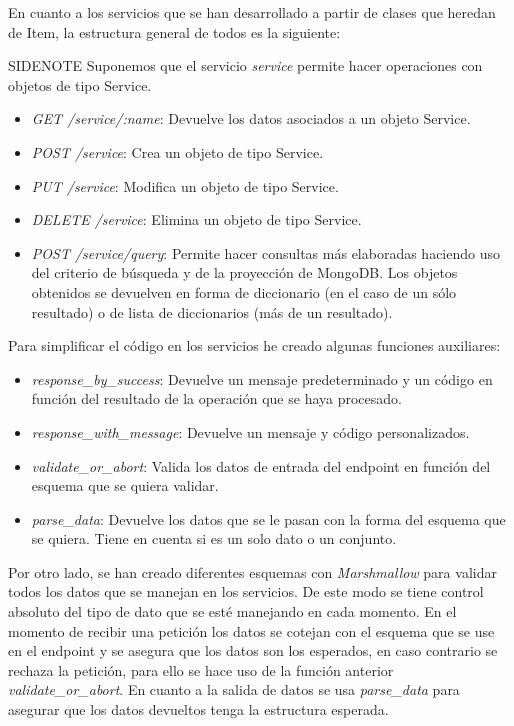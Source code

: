 En cuanto a los servicios que se han desarrollado a partir de clases que heredan de Item, la estructura general de todos es la siguiente:

\bigskip
SIDENOTE Suponemos que el servicio \textit{service} permite hacer operaciones con objetos de tipo Service.
\begin{itemize}
	\item \textit{GET /service/:name}: Devuelve los datos asociados a un objeto Service.
	\item \textit{POST /service}: Crea un objeto de tipo Service.
	\item \textit{PUT /service}: Modifica un objeto de tipo Service.
	\item \textit{DELETE /service}: Elimina un objeto de tipo Service.
	\item \textit{POST /service/query}: Permite hacer consultas más elaboradas haciendo uso del criterio de búsqueda y de la proyección de MongoDB. Los objetos obtenidos se devuelven en forma de diccionario (en el caso de un sólo resultado) o de lista de diccionarios (más de un resultado).
\end{itemize}


\bigskip
Para simplificar el código en los servicios he creado algunas funciones auxiliares:
\begin{itemize}
	\item \textit{response\_by\_success}: Devuelve un mensaje predeterminado y un código en función del resultado de la operación que se haya procesado.
	\item \textit{response\_with\_message}: Devuelve un mensaje y código personalizados.
	\item \textit{validate\_or\_abort}: Valida los datos de entrada del endpoint en función del esquema que se quiera validar.
	\item \textit{parse\_data}: Devuelve los datos que se le pasan con la forma del esquema que se quiera. Tiene en cuenta si es un solo dato o un conjunto.
\end{itemize}


\bigskip
Por otro lado, se han creado diferentes esquemas con \textit{Marshmallow} para validar todos los datos que se manejan en los servicios. De este modo se tiene control absoluto del tipo de dato que se esté manejando en cada momento. En el momento de recibir una petición los datos se cotejan con el esquema que se use en el endpoint y se asegura que los datos son los esperados, en caso contrario se rechaza la petición, para ello se hace uso de la función anterior \textit{validate\_or\_abort}. En cuanto a la salida de datos se usa \textit{parse\_data} para asegurar que los datos devueltos tenga la estructura esperada.


